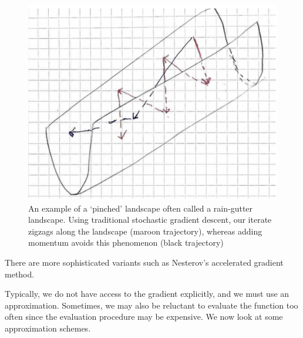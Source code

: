 \begin{figure}[!ht]
    \centering
    \includegraphics[width=0.7\linewidth]{raingutter.png}
    \caption{An example of a `pinched' landscape often called a rain-gutter landscape. Using traditional stochastic gradient descent, our iterate zigzags along the landscape (maroon trajectory), whereas adding momentum avoids this phenomenon (black trajectory)}
    \label{fig:raingutter}
\end{figure}
\newpage

There are more sophisticated variants such as Nesterov's accelerated gradient method. 

Typically, we do not have access to the gradient explicitly, and we must use an approximation. Sometimes, we may also be reluctant to evaluate the function too often since the evaluation procedure may be expensive. We now look at some approximation schemes. 

